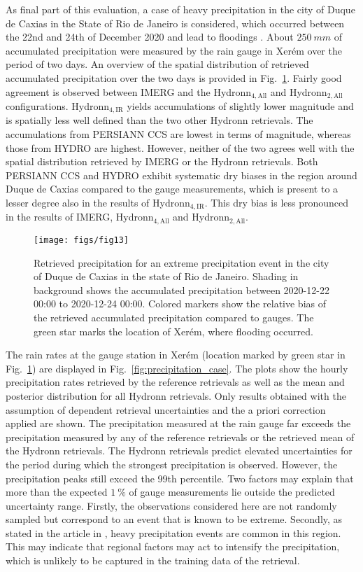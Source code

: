 \documentclass[journal abbreviation, manuscript]{copernicus}
\newcommand{\hydronntwo}{Hydronn$_{2, \text{All}}$}
\newcommand{\hydronnfourall}{Hydronn$_{4, \text{All}}$}
\newcommand{\hydronnfourir}{Hydronn$_{4, \text{IR}}$}
\begin{document}
As final part of this evaluation, a case of heavy precipitation in the city of
Duque de Caxias in the State of Rio de Janeiro is considered, which occurred
between the 22nd and 24th of December 2020 and lead to floodings
\citep{flooding}. About $250\ \unit{mm}$ of accumulated precipitation were
measured by the rain gauge in Xer\'em over the period of two days. An overview
of the spatial distribution of retrieved accumulated precipitation over the two
days is provided in Fig.~\ref{fig:accumulations_case}. Fairly good agreement is
observed between IMERG and the \hydronnfourall{} and \hydronntwo{}
configurations. \hydronnfourir{} yields accumulations of slightly lower
magnitude and is spatially less well defined than the two other Hydronn
retrievals. The accumulations from PERSIANN CCS are lowest in terms of
magnitude, whereas those from HYDRO are highest. However, neither of the two
agrees well with the spatial distribution retrieved by IMERG or the Hydronn
retrievals. Both PERSIANN CCS and HYDRO exhibit systematic dry biases in the
region around Duque de Caxias compared to the gauge measurements, which is
present to a lesser degree also in the results of \hydronnfourir{}. This
dry bias is less pronounced in the results of IMERG, \hydronnfourall{} and
\hydronntwo{}.

\begin{figure}[!hbpt]
  \centering
  \texttt{[image: figs/fig13]}
  \caption{
    Retrieved precipitation for an extreme precipitation event in the city of
    Duque de Caxias in the state of Rio de Janeiro. Shading in background shows
    the accumulated precipitation between 2020-12-22 00:00 to 2020-12-24 00:00.
    Colored markers show the relative bias of the retrieved accumulated
    precipitation compared to gauges. The green star marks the location of
    Xer\'em, where flooding occurred.
  }
  \label{fig:accumulations_case}
\end{figure}

The rain rates at the gauge station in Xer\'em (location marked by green star in
Fig.~\ref{fig:accumulations_case}) are displayed in
Fig.~\ref{fig:precipitation_case}. The plots show the hourly precipitation rates
retrieved by the reference retrievals as well as the mean and posterior
distribution for all Hydronn retrievals. Only results obtained with the
assumption of dependent retrieval uncertainties and the a priori correction
applied are shown. The precipitation measured at the rain gauge far exceeds the
precipitation measured by any of the reference retrievals or the retrieved mean
of the Hydronn retrievals. The Hydronn retrievals predict elevated uncertainties
for the period during which the strongest precipitation is observed. However,  the
precipitation peaks still exceed the 99th percentile. Two factors may explain
that more than the expected $1\ \unit{\%}$ of gauge measurements lie outside the
predicted uncertainty range. Firstly, the observations considered here are not
randomly sampled but correspond to an event that is known to be extreme.
Secondly, as stated in the article in \citet{flooding}, heavy precipitation
events are common in this region. This may indicate that  regional factors
may act to intensify the precipitation, which is unlikely to be captured in the
training data of the retrieval.
\end{document}
